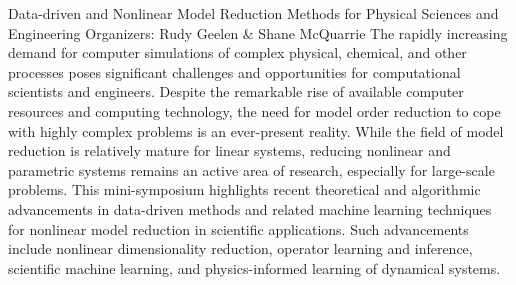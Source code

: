 \label{mini30}

\miniabs
{Data-driven and Nonlinear Model Reduction Methods for Physical Sciences and Engineering}
{Organizers: Rudy Geelen \& Shane McQuarrie}
{The rapidly increasing demand for computer simulations of complex physical, chemical, and other processes poses significant challenges and opportunities for computational scientists and engineers. Despite the remarkable rise of available computer resources and computing technology, the need for model order reduction to cope with highly complex problems is an ever-present reality. While the field of model reduction is relatively mature for linear systems, reducing nonlinear and parametric systems remains an active area of research, especially for large-scale problems. This mini-symposium highlights recent theoretical and algorithmic advancements in data-driven methods and related machine learning techniques for nonlinear model reduction in scientific applications. Such advancements include nonlinear dimensionality reduction, operator learning and inference, scientific machine learning, and physics-informed learning of dynamical systems.}

